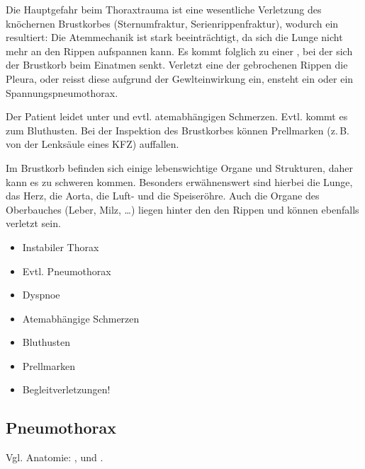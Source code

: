 {
Die Hauptgefahr beim Thoraxtrauma ist eine wesentliche
Verletzung des knöchernen Brustkorbes (Sternumfraktur,
Serienrippenfraktur), wodurch ein 
resultiert: Die Atemmechanik ist stark beeinträchtigt, da
sich die Lunge nicht mehr an den Rippen aufspannen
kann. Es kommt folglich zu einer , bei der sich der Brustkorb
beim Einatmen
senkt.
Verletzt eine der gebrochenen Rippen die Pleura, oder reisst
diese aufgrund der Gewlteinwirkung ein, ensteht ein
 oder ein
Spannungspneumothorax.

Der Patient leidet unter  und evtl.
atemabhängigen Schmerzen. Evtl. kommt es zum Bluthusten. Bei
der Inspektion des Brustkorbes können Prellmarken (z.\,B.
von der Lenksäule eines KFZ) auffallen.

Im Brustkorb befinden sich einige lebenswichtige Organe und
Strukturen, daher kann es zu schweren
 kommen.
Besonders erwähnenswert sind hierbei die Lunge, das Herz,
die Aorta, die Luft- und die Speiseröhre. Auch die Organe
des Oberbauches (Leber, Milz, \ldots) liegen hinter den den
Rippen und können ebenfalls verletzt sein.


}{
\begin{itemize}
  \item Instabiler Thorax
  \item Evtl. Pneumothorax
  \item Dyspnoe
  \item Atemabhängige Schmerzen
  \item Bluthusten
  \item Prellmarken
  \item Begleitverletzungen!
\end{itemize}
}{}{}{}



\subsection{Pneumothorax}\label{topic:pneumothorax}


Vgl. Anatomie: , und
.

